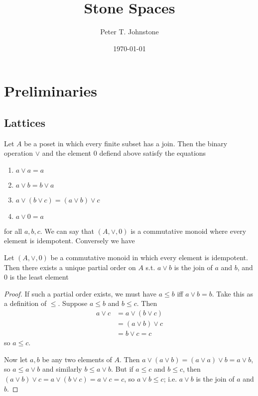 \documentclass[11pt]{article}
\author{Peter T. Johnstone}
\date{\today}
\title{Stone Spaces}
\begin{document}
\maketitle
\tableofcontents


\section{Preliminaries}
\label{sec:orgfd1ad42}

\subsection{Lattices}
\label{sec:orga07e204}
Let \(A\) be a poset in which every finite subset has a join. Then the binary
operation \(\vee\) and the element 0 defiend above satisfy the equations
\begin{enumerate}
\item \(a\vee a=a\)
\item \(a\vee b=b\vee a\)
\item \(a\vee(b\vee c)=(a\vee b)\vee c\)
\item \(a\vee0=a\)
\end{enumerate}


for all \(a,b,c\). We can say that \((A,\vee,0)\) is a commutative monoid
where every element is idempotent. Conversely we have

\begin{theorem}[]
Let \((A,\vee,0)\) be a commutative monoid in which every element is
idempotent. Then there exists a unique partial order on \(A\) s.t.
\(a\vee b\) is the join of \(a\) and \(b\), and 0 is the least element
\end{theorem}

\begin{proof}
If such a partial order exists, we must have \(a\le b\) iff \(a\vee b=b\).
Take this as a definition of \(\le\). Suppose \(a\le b\) and \(b\le c\). Then
\begin{align*}
a\vee c&=a\vee(b\vee c)\\
&=(a\vee b)\vee c\\
&=b\vee c=c
\end{align*}
so \(a\le c\).

Now let \(a,b\) be any two elements of \(A\). Then
\(a\vee(a\vee b)=(a\vee a)\vee b=a\vee b\), so \(a\le a\vee b\) and similarly
\(b\le a\vee b\). But if \(a\le c\) and \(b\le c\), then \((a\vee b)\vee
   c=a\vee(b\vee c)=a\vee c=c\), so \(a\vee b\le c\); i.e. \(a\vee b\) is the
join of \(a\) and \(b\).
\end{proof}
\end{document}
